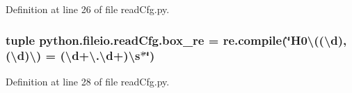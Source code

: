 Definition at line 26 of file read\-Cfg.\-py.

\hypertarget{namespacepython_1_1fileio_1_1read_cfg_ab37ee94881162c11a48d464d4ac60ade}{
\subsubsection[{box\-\_\-re}]{\setlength{\rightskip}{0pt plus 5cm}tuple python.\-fileio.\-read\-Cfg.\-box\-\_\-re = re.\-compile(\char`\"{}H0\textbackslash{}((\textbackslash{}{\bf d}),(\textbackslash{}{\bf d})\textbackslash{}) = (\textbackslash{}{\bf d}+\textbackslash{}.\textbackslash{}{\bf d}+)\textbackslash{}{\bf s}$\ast$\char`\"{})}}\label{namespacepython_1_1fileio_1_1read_cfg_ab37ee94881162c11a48d464d4ac60ade}


Definition at line 28 of file read\-Cfg.\-py.

